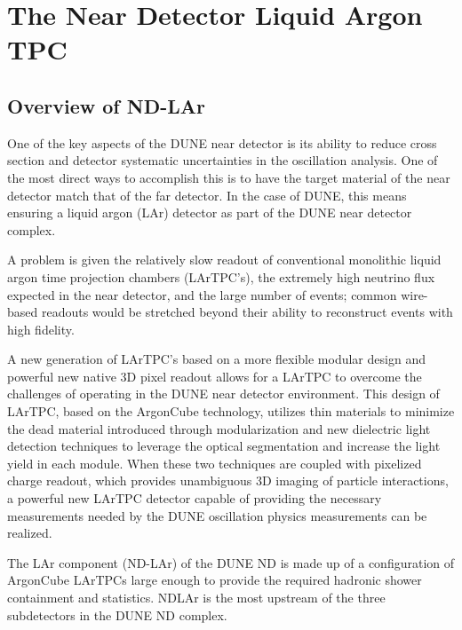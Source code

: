\chapter{The Near Detector Liquid Argon TPC}
\label{ch:lartpc}


\section{Overview of ND-LAr}\label{sec:lartpc-ovvw}

One of the key aspects of the DUNE near detector is its ability to reduce cross section and detector systematic uncertainties in the oscillation analysis. One of the most direct ways to accomplish this is to have the target material of the near detector match that of the far detector. In the case of DUNE, this means ensuring a liquid argon (LAr) detector as part of the DUNE near detector complex. 

A problem is given the relatively slow readout of conventional monolithic liquid argon time projection chambers (LArTPC's), the extremely high neutrino flux expected in the near detector, and the large number of events; common wire-based readouts would be stretched beyond their ability to reconstruct events with high fidelity. 

A new generation of LArTPC's based on a more flexible modular design and powerful new native 3D pixel readout allows for a LArTPC to overcome the challenges of operating in the DUNE near detector environment. This design of LArTPC, based on the ArgonCube technology, utilizes thin materials to minimize the dead material introduced through modularization and new dielectric light detection techniques to leverage the optical segmentation and increase the light yield in each module. When these two techniques are coupled with pixelized charge readout, which provides unambiguous
3D imaging of particle interactions, a powerful new LArTPC detector capable of providing the necessary measurements needed by the DUNE oscillation physics measurements can be realized.

The LAr component (ND-LAr) of the DUNE ND is made up of a configuration of ArgonCube LArTPCs large enough to provide the required hadronic shower containment and statistics. NDLAr is the most upstream of the three subdetectors in the DUNE ND complex.

